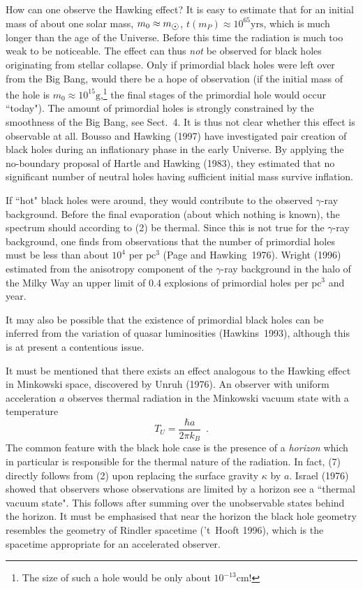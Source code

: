 \documentclass[12pt]{article}
\def\sun{\hbox{$\odot$}}
\newcommand{\be}{\begin{equation}}
\newcommand{\ee}{\end{equation}}
\begin{document}
How can one observe the Hawking effect? It is easy to estimate that
for an initial mass of about one solar mass, $m_0\approx m_{\sun}$,
$t(m_P)\approx 10^{65}\mbox{yrs}$, which is much longer than the
age of the Universe. Before this time the radiation is much too weak
to be noticeable.
 The effect can thus {\em not} be observed
for black holes originating from stellar collapse. Only if
primordial black holes were left over from the Big Bang,
would there be a hope of observation (if the initial mass of
the hole is $m_0\approx 10^{15}\mbox{g}$,\footnote{The size of such
a hole would be only about $10^{-13}\mbox{cm}$!}
 the final stages
of the primordial hole would occur ``today"). The amount of primordial
holes is strongly constrained by the smoothness of the Big Bang,
see Sect.~4. It is thus not clear whether this effect is observable
at all. Bousso and Hawking (1997) have investigated pair creation
of black holes during an inflationary phase in the early Universe.
By applying the no-boundary proposal of Hartle and Hawking (1983),
they estimated that no significant number of neutral holes
having sufficient initial mass survive inflation.

If ``hot" black holes were around, they would contribute to the
observed $\gamma$-ray background. Before the final evaporation
(about which nothing is known), the spectrum should
according to (2) be thermal. Since this is not true for
the $\gamma$-ray background, one finds from observations that
the number of primordial holes must be less than about $10^4$
per $\mbox{pc}^3$ (Page and Hawking~1976). Wright (1996) estimated
from the anisotropy component of the $\gamma$-ray background in the 
halo of the Milky Way an upper limit of $0.4$ explosions
of primordial holes per $\mbox{pc}^3$ and year. 

It may also be possible that the existence of primordial black holes
can be inferred from the variation of quasar luminosities
(Hawkins~1993), although this is at present a contentious issue.

\vskip 2mm
\normalsize

It must be mentioned that there exists an effect analogous to
the Hawking effect in Minkowski space, discovered by Unruh (1976).
An observer with uniform acceleration $a$ observes thermal
radiation in the Minkowski vacuum state with a temperature
\be T_U=\frac{\hbar a}{2\pi k_B} \enspace . \ee
The common feature with the black hole case is the presence of
a {\em horizon} which in particular is responsible for the
thermal nature of the radiation. In fact, (7) directly follows from
(2) upon replacing the surface gravity $\kappa$ by $a$.
Israel (1976) showed that observers whose observations are limited
by a horizon see a ``thermal vacuum state". This follows after
summing over the unobservable states behind the horizon.
It must be emphasised that near the horizon the black hole
geometry resembles the geometry of Rindler spacetime ('t~Hooft
1996), which is the spacetime appropriate for an accelerated
observer.
\end{document}
